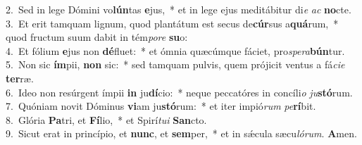 {2.~}Sed in lege Dómini vo\textbf{lún}tas \textbf{e}jus,~* et in lege ejus meditábitur di\textit{e} \textit{ac} \textbf{no}cte.\\
{3.~}Et erit tamquam lignum, quod plantátum est secus de\textbf{cúr}sus a\textbf{quá}rum,~* quod fructum suum dabit in tém\textit{po}\textit{re} \textbf{su}o:\\
{4.~}Et fólium \textbf{e}jus non \textbf{dé}fluet:~* et ómnia quæcúmque fáciet, pro\textit{spe}\textit{ra}\textbf{bún}tur.\\
{5.~}Non sic \textbf{ím}pii, \textbf{non} sic:~* sed tamquam pulvis, quem prójicit ventus a fá\textit{ci}\textit{e} \textbf{ter}ræ.\\
{6.~}Ideo non resúrgent ímpii \textbf{in} ju\textbf{dí}cio:~* neque peccatóres in concíli\textit{o} \textit{ju}\textbf{stó}rum.\\
{7.~}Quóniam novit Dóminus \textbf{vi}am ju\textbf{stó}rum:~* et iter impió\textit{rum} \textit{pe}\textbf{rí}bit.\\
{8.~}Glória \textbf{Pa}tri, et \textbf{Fí}lio,~* et Spirí\textit{tu}\textit{i} \textbf{San}cto.\\
{9.~}Sicut erat in princípio, et \textbf{nunc}, et \textbf{sem}per,~* et in sǽcula sæcu\textit{ló}\textit{rum}. \textbf{A}men.\\
